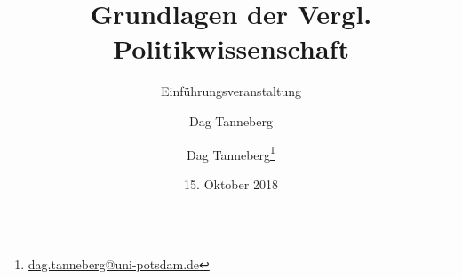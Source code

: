 \usepackage[ngerman]{babel}
\usepackage{graphicx}
\usepackage{hyperref}

\author{Dag Tanneberg}
\title{Grundlagen der Vergl. Politikwissenschaft}
\subtitle{Einführungsveranstaltung}
\author{Dag Tanneberg\thanks{%
  \href{mailto:dag.tanneberg@uni-potsdam.de}%
    {dag.tanneberg@uni-potsdam.de}
  }
}
\date{15. Oktober 2018}
\hypersetup{colorlinks, urlcolor = red, linkcolor = }